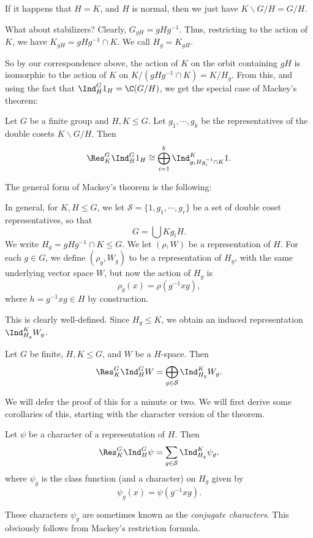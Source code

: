 \documentclass[a4paper]{article}
\begin{document}
If it happens that $H = K$, and $H$ is normal, then we just have $K\backslash G/H = G/H$.

What about stabilizers? Clearly, $G_{gH} = gHg^{-1}$. Thus, restricting to the action of $K$, we have $K_{gH} = gHg^{-1} \cap K$. We call $H_g =K_{gH}$.

So by our correspondence above, the action of $K$ on the orbit containing $gH$ is isomorphic to the action of $K$ on $K/(gHg^{-1} \cap K) = K/H_g$. From this, and using the fact that $\Ind_H^G 1_H = \C(G/H)$, we get the special case of Mackey's theorem:
\begin{prop}
  Let $G$ be a finite group and $H, K \leq G$. Let $g_1, \cdots, g_k$ be the representatives of the double cosets $K \backslash G/H$. Then
  \[
    \Res_K^G \Ind_H^G 1_H \cong \bigoplus_{i = 1}^k \Ind_{g_iHg_i^{-1} \cap K}^K 1.
  \]
\end{prop}

The general form of Mackey's theorem is the following:
\begin{thm}
  In general, for $K, H \leq G$, we let $\mathcal{S} = \{1, g_1, \cdots, g_r\}$ be a set of double coset representatives, so that
  \[
    G = \bigcup K g_i H.
  \]
  We write $H_g = gHg^{-1} \cap K \leq G$. We let $(\rho, W)$ be a representation of $H$. For each $g \in G$, we define $(\rho_g, W_g)$ to be a representation of $H_g$, with the same underlying vector space $W$, but now the action of $H_g$ is
  \[
    \rho_g(x) = \rho(g^{-1} xg),
  \]
  where $h = g^{-1}xg \in H$ by construction.

  This is clearly well-defined. Since $H_g \leq K$, we obtain an induced representation $\Ind_{H_g}^K W_g$.

  Let $G$ be finite, $H, K \leq G$, and $W$ be a $H$-space. Then
  \[
    \Res_K^G \Ind_H^G W = \bigoplus_{g \in \mathcal{S}} \Ind_{H_g}^K W_g.
  \]
\end{thm}
We will defer the proof of this for a minute or two. We will first derive some corollaries of this, starting with the character version of the theorem.
\begin{cor}
  Let $\psi$ be a character of a representation of $H$. Then
  \[
    \Res_K^G \Ind_H^G \psi = \sum_{g \in \mathcal{S}} \Ind_{H_g}^K \psi_g,
  \]
  where $\psi_g$ is the class function (and a character) on $H_g$ given by
  \[
    \psi_g(x) = \psi(g^{-1} xg).
  \]
\end{cor}
These characters $\psi_g$ are sometimes known as the \emph{conjugate characters}. This obviously follows from Mackey's restriction formula.
\end{document}

